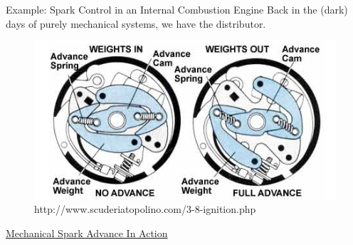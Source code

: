 \documentclass[aspectratio=169]{beamer}
\begin{document}
\begin{frame}[t]{Example: Spark Control in an Internal Combustion Engine}
Back in the (dark) days of purely mechanical systems, we have the distributor.
\begin{figure}
\includegraphics[scale=0.70]{img/3-8-ignition_clip_image005.jpg}
\caption{http://www.scuderiatopolino.com/3-8-ignition.php}
\end{figure}
\href{https://www.youtube.com/watch?v=RcmkbQVPz9E}{Mechanical Spark Advance In Action}
\end{frame}
\end{document}

